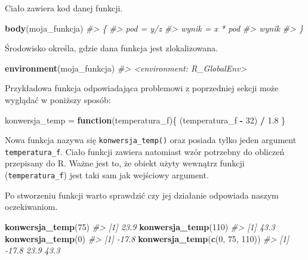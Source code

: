 \documentclass[paper=6in:9in,pagesize=pdftex,headinclude=on,footinclude=on,10pt]{scrbook}
\newenvironment{Shaded}{\begin{snugshade}}{\end{snugshade}}
\newcommand{\CommentTok}[1]{\textcolor[rgb]{0.56,0.35,0.01}{\textit{#1}}}
\newcommand{\ControlFlowTok}[1]{\textcolor[rgb]{0.13,0.29,0.53}{\textbf{#1}}}
\newcommand{\DecValTok}[1]{\textcolor[rgb]{0.00,0.00,0.81}{#1}}
\newcommand{\FloatTok}[1]{\textcolor[rgb]{0.00,0.00,0.81}{#1}}
\newcommand{\KeywordTok}[1]{\textcolor[rgb]{0.13,0.29,0.53}{\textbf{#1}}}
\newcommand{\NormalTok}[1]{#1}
\newcommand{\OperatorTok}[1]{\textcolor[rgb]{0.81,0.36,0.00}{\textbf{#1}}}
\newcommand{\StringTok}[1]{\textcolor[rgb]{0.31,0.60,0.02}{#1}}
\begin{document}
Ciało zawiera kod danej funkcji.

\begin{Shaded}
\begin{Highlighting}[]
\KeywordTok{body}\NormalTok{(moja_funkcja)}
\CommentTok{#> \{}
\CommentTok{#>     pod = y/z}
\CommentTok{#>     wynik = x * pod}
\CommentTok{#>     wynik}
\CommentTok{#> \}}
\end{Highlighting}
\end{Shaded}

Środowisko określa, gdzie dana funkcja jest zlokalizowana.

\begin{Shaded}
\begin{Highlighting}[]
\KeywordTok{environment}\NormalTok{(moja_funkcja)}
\CommentTok{#> <environment: R_GlobalEnv>}
\end{Highlighting}
\end{Shaded}

Przykładowa funkcja odpowiadająca problemowi z poprzedniej sekcji może wyglądać w poniższy sposób:

\begin{Shaded}
\begin{Highlighting}[]
\NormalTok{konwersja_temp =}\StringTok{ }\ControlFlowTok{function}\NormalTok{(temperatura_f)\{}
\NormalTok{    (temperatura_f }\OperatorTok{-}\StringTok{ }\DecValTok{32}\NormalTok{) }\OperatorTok{/}\StringTok{ }\FloatTok{1.8}
\NormalTok{\}}
\end{Highlighting}
\end{Shaded}

Nowa funkcja nazywa się \texttt{konwersja\_temp()} oraz posiada tylko jeden argument \texttt{temperatura\_f}.
Ciało funkcji zawiera natomiast wzór potrzebny do obliczeń przepisany do R.
Ważne jest to, że obiekt użyty wewnątrz funkcji (\texttt{temperatura\_f}) jest taki sam jak wejściowy argument.

Po stworzeniu funkcji warto sprawdzić czy jej działanie odpowiada naszym oczekiwaniom.

\begin{Shaded}
\begin{Highlighting}[]
\KeywordTok{konwersja_temp}\NormalTok{(}\DecValTok{75}\NormalTok{)}
\CommentTok{#> [1] 23.9}
\KeywordTok{konwersja_temp}\NormalTok{(}\DecValTok{110}\NormalTok{)}
\CommentTok{#> [1] 43.3}
\KeywordTok{konwersja_temp}\NormalTok{(}\DecValTok{0}\NormalTok{)}
\CommentTok{#> [1] -17.8}
\KeywordTok{konwersja_temp}\NormalTok{(}\KeywordTok{c}\NormalTok{(}\DecValTok{0}\NormalTok{, }\DecValTok{75}\NormalTok{, }\DecValTok{110}\NormalTok{))}
\CommentTok{#> [1] -17.8  23.9  43.3}
\end{Highlighting}
\end{Shaded}
\end{document}
